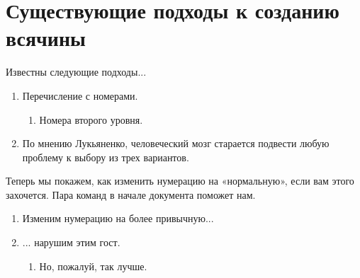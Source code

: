 \section{Существующие подходы к созданию всячины}

Известны следующие подходы...

\begin{enumerate}
\item Перечисление с номерами.
\begin{enumerate}
\item Номера второго уровня.
\end{enumerate}
\item По мнению Лукьяненко, человеческий мозг старается подвести любую проблему к выбору
  из трех вариантов.
\end{enumerate}

Теперь мы покажем, как изменить нумерацию на «нормальную», если вам этого захочется. Пара команд в начале документа поможет нам.

\renewcommand{\labelenumi}{\arabic{enumi})}
\renewcommand{\labelenumii}{\asbuk{enumii})}

\begin{enumerate}
\item Изменим нумерацию на более привычную...
\item ... нарушим этим гост.
\begin{enumerate}
\item Но, пожалуй, так лучше.
\end{enumerate}
\end{enumerate}






  
